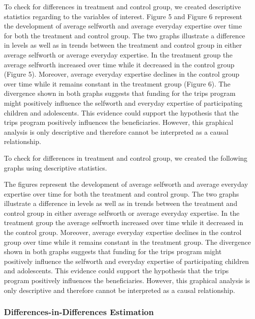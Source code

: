 \documentclass[12pt, a4paper, titlepage]{article}\usepackage[]{graphicx}\usepackage[]{color}
\begin{document}
To check for differences in treatment and control group, we created descriptive statistics regarding to the variables of interest.
Figure 5 and Figure 6 represent the development of average selfworth and average everyday expertise over time for both the treatment and control group. The two graphs illustrate a difference in levels as well as in trends between the treatment and control group in either average selfworth or average everyday expertise. In the treatment group the average selfworth increased over time  while it decreased in the control group (Figure 5). Moreover, average everyday expertise declines in the control group over time while it remains constant in the treatment group (Figure 6). The divergence shown in both graphs suggests that funding for the trips program might positively influence the selfworth and everyday expertise of participating children and adolescents. This evidence could support the hypothesis that the trips program positively influences the beneficiaries. However, this graphical analysis is only descriptive and therefore cannot be interpreted as a causal relationship.

To check for differences in treatment and control group, we created the following graphs using descriptive statistics. 

The figures represent the development of average selfworth and average everyday expertise over time for both the treatment and control group. The two graphs illustrate a difference in levels as well as in trends between the treatment and control group in either average selfworth or average everyday expertise. In the treatment group the average selfworth increased over time while it decreased in the control group. Moreover, average everyday expertise declines in the control group over time while it remains constant in the treatment group. The divergence shown in both graphs suggests that funding for the trips program might positively influence the selfworth and everyday expertise of participating children and adolescents. This evidence could support the hypothesis that the trips program positively influences the beneficiaries. However, this graphical analysis is only descriptive and therefore cannot be interpreted as a causal relationship.


\subsubsection{Differences-in-Differences Estimation}
\end{document}
